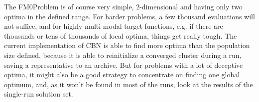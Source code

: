 The FM0Problem is of course very simple, 2-dimensional and having
only two optima in the defined range. For harder problems, a few thousand
evaluations will not suffice, and for highly multi-modal target functions,
e.g. if there are thousands or tens of thousands of local optima,
things get really tough. The current implementation of CBN is able
to find more optima than the population size defined, because it is
able to reinitialize a converged cluster during a run, saving a representative
to an archive. But for problems with a lot of deceptive optima, it
might also be a good strategy to concentrate on finding one global
optimum, and, as it won't be found in most of the runs, look at the
results of the single-run solution set.